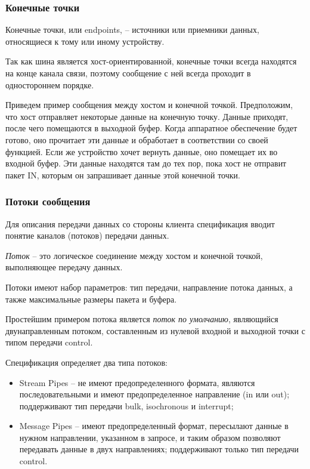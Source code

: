 \subsubsection{Конечные точки}

Конечные точки, или endpoints, -- источники или приемники данных, относящиеся
к тому или иному устройству.

Так как шина является хост-ориентированной, конечные точки всегда находятся
на конце канала связи, поэтому сообщение с ней всегда проходит
в одностороннем порядке.

Приведем пример сообщения между хостом и конечной точкой. Предположим, что хост
отправляет некоторые данные на конечную точку. Данные приходят, после чего
помещаются в выходной буфер. Когда аппаратное обеспечение будет готово,
оно прочитает эти данные и обработает в соответствии со своей функцией.
Если же устройство хочет вернуть данные, оно помещает их во входной буфер.
Эти данные находятся там до тех пор, пока хост не отправит пакет IN, которым
он запрашивает данные этой конечной точки.

\subsubsection{Потоки сообщения}

Для описания передачи данных со стороны клиента спецификация вводит
понятие каналов (потоков) передачи данных.

\emph{Поток} -- это логическое соединение между
хостом и конечной точкой, выполняющее передачу данных.

Потоки имеют набор параметров: тип передачи,
направление потока данных, а также максимальные размеры пакета и буфера.

Простейшим примером потока является \emph{поток по умолчанию}, являющийся
двунаправленным потоком, составленным 
из нулевой входной и выходной точки с типом передачи control.

Спецификация определяет два типа потоков:
\begin{itemize}
    \item Stream Pipes -- не имеют предопределенного формата,
          являются последовательными и имеют предопределенное направление (in или out);
          поддерживают тип передачи bulk, isochronous и interrupt;

    \item Message Pipes -- имеют предопределенный формат, пересылают
          данные в нужном направлении, указанном в запросе, и таким образом
          позволяют передавать данные в двух направлениях; 
          поддерживают только тип передачи control. 
\end{itemize}

